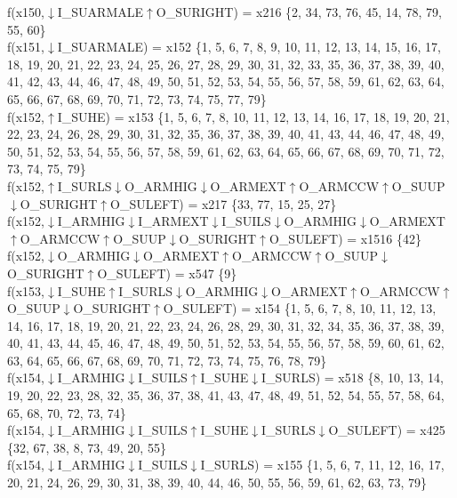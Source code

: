 f(x150,$\downarrow$I\_SUARMALE$\uparrow$O\_SURIGHT) = x216 \{2, 34, 73, 76, 45, 14, 78, 79, 55, 60\} \\  
f(x151,$\downarrow$I\_SUARMALE) = x152 \{1, 5, 6, 7, 8, 9, 10, 11, 12, 13, 14, 15, 16, 17, 18, 19, 20, 21, 22, 23, 24, 25, 26, 27, 28, 29, 30, 31, 32, 33, 35, 36, 37, 38, 39, 40, 41, 42, 43, 44, 46, 47, 48, 49, 50, 51, 52, 53, 54, 55, 56, 57, 58, 59, 61, 62, 63, 64, 65, 66, 67, 68, 69, 70, 71, 72, 73, 74, 75, 77, 79\} \\  
f(x152,$\uparrow$I\_SUHE) = x153 \{1, 5, 6, 7, 8, 10, 11, 12, 13, 14, 16, 17, 18, 19, 20, 21, 22, 23, 24, 26, 28, 29, 30, 31, 32, 35, 36, 37, 38, 39, 40, 41, 43, 44, 46, 47, 48, 49, 50, 51, 52, 53, 54, 55, 56, 57, 58, 59, 61, 62, 63, 64, 65, 66, 67, 68, 69, 70, 71, 72, 73, 74, 75, 79\} \\  
f(x152,$\uparrow$I\_SURLS$\downarrow$O\_ARMHIG$\downarrow$O\_ARMEXT$\uparrow$O\_ARMCCW$\uparrow$O\_SUUP$\downarrow$O\_SURIGHT$\uparrow$O\_SULEFT) = x217 \{33, 77, 15, 25, 27\} \\  
f(x152,$\downarrow$I\_ARMHIG$\downarrow$I\_ARMEXT$\downarrow$I\_SUILS$\downarrow$O\_ARMHIG$\downarrow$O\_ARMEXT$\uparrow$O\_ARMCCW$\uparrow$O\_SUUP$\downarrow$O\_SURIGHT$\uparrow$O\_SULEFT) = x1516 \{42\} \\  
f(x152,$\downarrow$O\_ARMHIG$\downarrow$O\_ARMEXT$\uparrow$O\_ARMCCW$\uparrow$O\_SUUP$\downarrow$O\_SURIGHT$\uparrow$O\_SULEFT) = x547 \{9\} \\  
f(x153,$\downarrow$I\_SUHE$\uparrow$I\_SURLS$\downarrow$O\_ARMHIG$\downarrow$O\_ARMEXT$\uparrow$O\_ARMCCW$\uparrow$O\_SUUP$\downarrow$O\_SURIGHT$\uparrow$O\_SULEFT) = x154 \{1, 5, 6, 7, 8, 10, 11, 12, 13, 14, 16, 17, 18, 19, 20, 21, 22, 23, 24, 26, 28, 29, 30, 31, 32, 34, 35, 36, 37, 38, 39, 40, 41, 43, 44, 45, 46, 47, 48, 49, 50, 51, 52, 53, 54, 55, 56, 57, 58, 59, 60, 61, 62, 63, 64, 65, 66, 67, 68, 69, 70, 71, 72, 73, 74, 75, 76, 78, 79\} \\  
f(x154,$\downarrow$I\_ARMHIG$\downarrow$I\_SUILS$\uparrow$I\_SUHE$\downarrow$I\_SURLS) = x518 \{8, 10, 13, 14, 19, 20, 22, 23, 28, 32, 35, 36, 37, 38, 41, 43, 47, 48, 49, 51, 52, 54, 55, 57, 58, 64, 65, 68, 70, 72, 73, 74\} \\  
f(x154,$\downarrow$I\_ARMHIG$\downarrow$I\_SUILS$\uparrow$I\_SUHE$\downarrow$I\_SURLS$\downarrow$O\_SULEFT) = x425 \{32, 67, 38, 8, 73, 49, 20, 55\} \\  
f(x154,$\downarrow$I\_ARMHIG$\downarrow$I\_SUILS$\downarrow$I\_SURLS) = x155 \{1, 5, 6, 7, 11, 12, 16, 17, 20, 21, 24, 26, 29, 30, 31, 38, 39, 40, 44, 46, 50, 55, 56, 59, 61, 62, 63, 73, 79\} \\  
